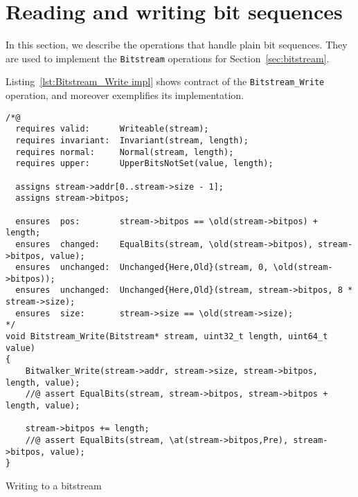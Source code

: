 \FloatBarrier


\section{Reading and writing bit sequences}
\label{sec:bit sequences}

In this section, we describe the operations that handle plain bit sequences.
%
They are used to implement the \lstinline{Bitstream} operations for
Section~\ref{sec:bitstream}.

Listing~\ref{lst:Bitstream_Write impl} shows contract of
the \lstinline{Bitstream_Write} operation,
and moreover exemplifies its implementation.


\begin{listing}[hbt]
\begin{minipage}{0.99\textwidth}
\begin{lstlisting}[style=acsl-block]
/*@
  requires valid:      Writeable(stream);
  requires invariant:  Invariant(stream, length);
  requires normal:     Normal(stream, length);
  requires upper:      UpperBitsNotSet(value, length);

  assigns stream->addr[0..stream->size - 1];
  assigns stream->bitpos;

  ensures  pos:        stream->bitpos == \old(stream->bitpos) + length;
  ensures  changed:    EqualBits(stream, \old(stream->bitpos), stream->bitpos, value);
  ensures  unchanged:  Unchanged{Here,Old}(stream, 0, \old(stream->bitpos));
  ensures  unchanged:  Unchanged{Here,Old}(stream, stream->bitpos, 8 * stream->size);
  ensures  size:       stream->size == \old(stream->size);
*/
void Bitstream_Write(Bitstream* stream, uint32_t length, uint64_t value)
{
    Bitwalker_Write(stream->addr, stream->size, stream->bitpos, length, value);
    //@ assert EqualBits(stream, stream->bitpos, stream->bitpos + length, value);

    stream->bitpos += length;
    //@ assert EqualBits(stream, \at(stream->bitpos,Pre), stream->bitpos, value);
}

\end{lstlisting}
\end{minipage}
\caption{\label{lst:Bitstream_Write impl}Writing to a bitstream}
\end{listing}

\FloatBarrier

